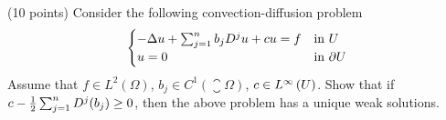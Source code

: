 (10 points)
Consider the following convection-diffusion problem
\begin{align*}
  \begin{cases}
    -\Delta u + \sum_{j = 1}^{n} b_j D^{j}{} u + c u = f & \text{in } U\\
    u = 0 & \text{in } \partial U
  \end{cases}
\end{align*}
Assume that $f \in L^2(\Omega)$, $b_j \in C^1(\closure{\Omega})$,
$c \in L^{\infty}\left(U \right)$.
Show that if $c - \frac{1}{2} \sum_{j = 1}^{n} D^{j}{}(b_j) \geq 0$,
then the above problem has a unique weak solutions.
